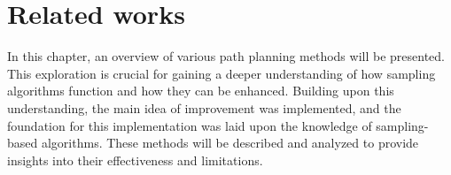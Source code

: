 \documentclass{ctuthesis}
\begin{document}
\chapter{Related works} 
\label{chap:RelatedWorks}
In this chapter, an overview of various path planning methods will be presented. 
This exploration is crucial for gaining a deeper understanding of how 
sampling algorithms function and how they can be enhanced. 
Building upon this understanding, 
the main idea of improvement was implemented, 
and the foundation for this implementation was laid upon the knowledge of 
sampling-based algorithms. 
These methods will be described and analyzed to provide 
insights into their effectiveness and limitations.
\end{document}
